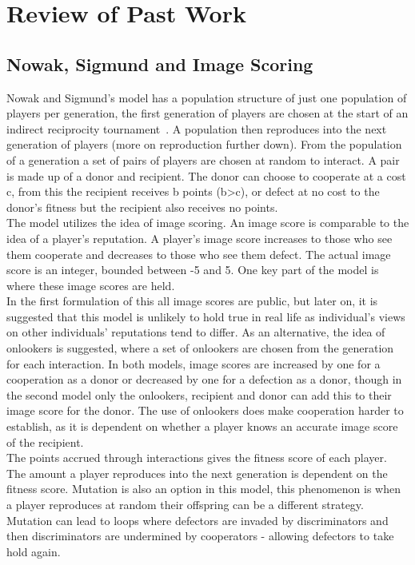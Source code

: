 \documentclass[twoside,twocolumn]{article}
\begin{document}

\section{Review of Past Work}
\subsection{Nowak, Sigmund and Image Scoring}
Nowak and Sigmund's model has a population structure of just one population of players per generation, the first generation of players are chosen at the start of an indirect reciprocity tournament~\cite{evol_indirect_image}. A population then reproduces into the next generation of players (more on reproduction further down). From the population of a generation a set of pairs of players are chosen at random to interact. A pair is made up of a donor and recipient. The donor can choose to cooperate at a cost c, from this the recipient receives b points (b>c), or defect at no cost to the donor's fitness but the recipient also receives no points.\\
The model utilizes the idea of image scoring. An image score is comparable to the idea of a player's reputation. A player's image score increases to those who see them cooperate and decreases to those who see them defect. The actual image score is an integer, bounded between -5 and 5. One key part of the model is where these image scores are held.\\
In the first formulation of this all image scores are public, but later on, it is suggested that this model is unlikely to hold true in real life as individual's views on other individuals' reputations tend to differ. As an alternative, the idea of onlookers is suggested, where a set of onlookers are chosen from the generation for each interaction. In both models, image scores are increased by one for a cooperation as a donor or decreased by one for a defection as a donor, though in the second model only the onlookers, recipient and donor can add this to their image score for the donor. The use of onlookers does make cooperation harder to establish, as it is dependent on whether a player knows an accurate image score of the recipient.\\
The points accrued through interactions gives the fitness score of each player. The amount a player reproduces into the next generation is dependent on the fitness score. Mutation is also an option in this model, this phenomenon is when a player reproduces at random their offspring can be a different strategy. Mutation can lead to loops where defectors are invaded by discriminators and then discriminators are undermined by cooperators - allowing defectors to take hold again.\\
\end{document}

